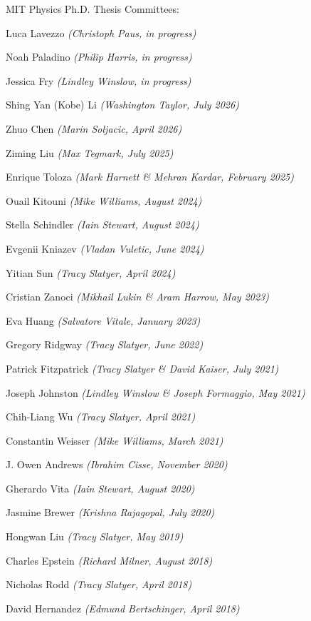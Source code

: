 \bbl

\item MIT Physics Ph.D. Thesis Committees:
\bsbl 
\item Luca Lavezzo \textit{(Christoph Paus, in progress)}
\item Noah Paladino \textit{(Philip Harris, in progress)}
\item Jessica Fry \textit{(Lindley Winslow, in progress)}
\item Shing Yan (Kobe) Li \textit{(Washington Taylor, July 2026)}
\item Zhuo Chen \textit{(Marin Soljacic, April 2026)}
\item Ziming Liu \textit{(Max Tegmark, July 2025)}
\item Enrique Toloza \textit{(Mark Harnett \& Mehran Kardar, February 2025)}
\item Ouail Kitouni \textit{(Mike Williams, August 2024)}
\item Stella Schindler \textit{(Iain Stewart, August 2024)}
\item Evgenii Kniazev \textit{(Vladan Vuletic, June 2024)}
\item Yitian Sun \textit{(Tracy Slatyer, April 2024)}
\item Cristian Zanoci \textit{(Mikhail Lukin \& Aram Harrow, May 2023)}
\item Eva Huang \textit{(Salvatore Vitale, January 2023)}
\item Gregory Ridgway \textit{(Tracy Slatyer, June 2022)}
\item Patrick Fitzpatrick \textit{(Tracy Slatyer \& David Kaiser, July 2021)}
\item Joseph Johnston \textit{(Lindley Winslow \& Joseph Formaggio, May 2021)}
\item Chih-Liang Wu \textit{(Tracy Slatyer, April 2021)}
\item Constantin Weisser \textit{(Mike Williams, March 2021)}
\item J. Owen Andrews \textit{(Ibrahim Cisse, November 2020)}
\item Gherardo Vita \textit{(Iain Stewart, August 2020)}
\item Jasmine Brewer \textit{(Krishna Rajagopal, July 2020)}
\item Hongwan Liu \textit{(Tracy Slatyer, May 2019)}
\item Charles Epstein \textit{(Richard Milner, August 2018)}
\item Nicholas Rodd \textit{(Tracy Slatyer, April 2018)}
\item David Hernandez \textit{(Edmund Bertschinger, April 2018)}

